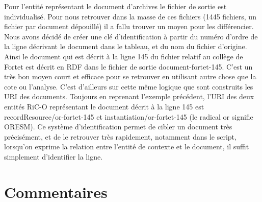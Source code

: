 Pour l'entité représentant le document d'archives le fichier de sortie est individualisé. Pour nous retrouver dans la masse de ces fichiers (1445 fichiers, un fichier par document dépouillé) il a fallu trouver un moyen pour les différencier. Nous avons décidé de créer une clé d'identification à partir du numéro d'ordre de la ligne décrivant le document dans le tableau, et du nom du fichier d'origine. Ainsi le document  qui est décrit à la ligne 145 du fichier relatif au collège de Fortet est décrit en RDF dans le fichier de sortie \og document-fortet-145\fg . C'est un très bon moyen court et efficace pour se retrouver en utilisant autre chose que la cote ou l'analyse. C'est d'ailleurs sur cette même logique que sont construits les URI des documents. Toujours en reprenant l'exemple précédent, l'URI des deux entités RiC-O représentant le document décrit à la ligne 145 est recordResource/or-fortet-145 et instantiation/or-fortet-145 (le radical or signifie ORESM). Ce système d'identification permet de cibler un document très précisément, et de le retrouver très rapidement, notamment dans le script, lorsqu'on exprime la relation entre l'entité de contexte et le document, il suffit simplement d'identifier la ligne.


\section{Commentaires}
